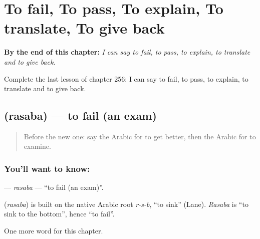 
\chapter{To fail, To pass, To explain, To translate, To give back}
\label{ch:ar-to-fail-to-pass-to-explain-to-translate-to-give-back}

\begin{chapteropening}
\textbf{By the end of this chapter:} \emph{I can say to fail, to pass, to explain, to translate and to give back.}

Complete the last lesson of chapter 256: I can say to fail, to pass, to explain, to translate and to give back.
\end{chapteropening}

\section[\texorpdfstring{\ar{رسب} (rasaba)}{رسب (rasaba)}]{ (rasaba) — to fail (an exam)}

\label{lesson:AR-C256-rasaba}



\begin{quote}
Before the new one: say the Arabic for to get better, then the Arabic for to examine.
\end{quote}

\subsection*{You'll want to know: }
\textbf{} — \emph{rasaba} — \textquotedblleft{}to fail (an exam)\textquotedblright{}.

\begin{cousinweb}
\textbf{} (\emph{rasaba}) is built on the native Arabic root \emph{r-s-b}, \textquotedblleft{}to sink\textquotedblright{} (Lane). \emph{Rasaba} is \textquotedblleft{}to sink to the bottom\textquotedblright{}, hence \textquotedblleft{}to fail\textquotedblright{}.
\end{cousinweb}

\begin{grammarlens}[title={What you've built}]
One more word for this chapter.
\end{grammarlens}

